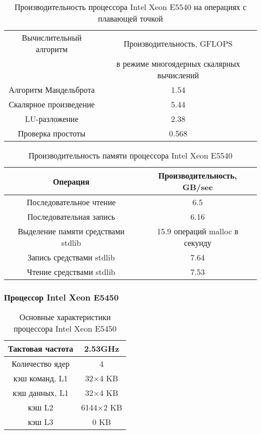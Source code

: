 \begin{table}[ht]
\begin{center}
\caption{Производительность процессора Intel Xeon  E5540 на операциях с плавающей точкой}
\begin{tabular}{|c|c|}
\hline	
Вычислительный алгоритм &  Производительность, GFLOPS \\ 
                 & в режиме многоядерных скалярных вычислений \\ \hline
Алгоритм Мандельброта  &  1.54 	\\ \hline
Скалярное произведение &  5.44   \\ \hline
LU-разложение          &  2.38   \\ \hline
Проверка простоты      & 0.568  \\ \hline 


		\end{tabular}
	\end{center} 	
\end{table} 	

\begin{table}[ht]
	\begin{center}
		\caption{Производительность памяти процессора Intel Xeon  E5540}
		\begin{tabular}{|c|c|}
			\hline	
			Операция  &  Производительность, GB/sec \\ \hline
			Последовательное чтение &  6.5 	\\  \hline
			Последовательная запись &  6.16   \\  \hline
			Выделение памяти средствами stdlib &  15.9 операций malloc в секунду  \\  \hline
			Запись средствами stdlib  & 7.64  \\ \hline
			Чтение средствами stdlib  & 7.53  \\ \hline 
		\end{tabular}
	\end{center} 	
\end{table} 	

\clearpage

\subsubsection{Процессор Intel Xeon  E5450}
\label{app_E5540}


\begin{table}[ht]
	\begin{center}
		\caption{Основные характеристики процессора Intel Xeon  E5450}
		\begin{tabular}{|c|c|}
			\hline	
			Тактовая частота & 2.53GHz   \\ \hline
			Количество ядер & 4 	     \\ \hline
			кэш команд, L1 &  32$\times$4  KB      \\ \hline
			кэш данных, L1 &  32$\times$4 KB       \\ \hline
			кэш L2         &  6144$\times$2 KB      \\ \hline
			кэш L3         &  0 KB        \\ \hline
		\end{tabular}
	\end{center} 	
\end{table} 	

